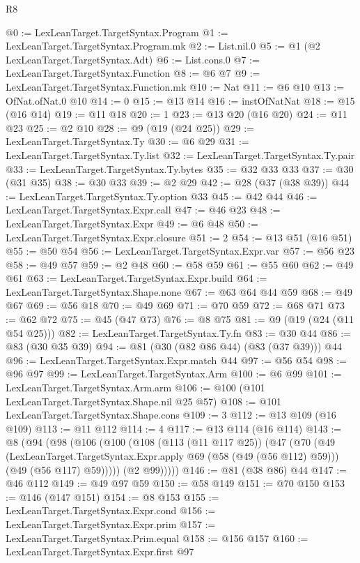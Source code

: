 \begin{lexlean}{R8}
\begin{coremodule}
@0 := LexLeanTarget.TargetSyntax.Program
@1 := LexLeanTarget.TargetSyntax.Program.mk
@2 := List.nil.{0}
@5 := @1 (@2 LexLeanTarget.TargetSyntax.Adt)
@6 := List.cons.{0}
@7 := LexLeanTarget.TargetSyntax.Function
@8 := @6 @7
@9 := LexLeanTarget.TargetSyntax.Function.mk
@10 := Nat
@11 := @6 @10
@13 := OfNat.ofNat.{0} @10
@14 := 0
@15 := @13 @14
@16 := instOfNatNat
@18 := @15 (@16 @14)
@19 := @11 @18
@20 := 1
@23 := @13 @20 (@16 @20)
@24 := @11 @23
@25 := @2 @10
@28 := @9 (@19 (@24 @25))
@29 := LexLeanTarget.TargetSyntax.Ty
@30 := @6 @29
@31 := LexLeanTarget.TargetSyntax.Ty.list
@32 := LexLeanTarget.TargetSyntax.Ty.pair
@33 := LexLeanTarget.TargetSyntax.Ty.bytes
@35 := @32 @33 @33
@37 := @30 (@31 @35)
@38 := @30 @33
@39 := @2 @29
@42 := @28 (@37 (@38 @39))
@44 := LexLeanTarget.TargetSyntax.Ty.option @33
@45 := @42 @44
@46 := LexLeanTarget.TargetSyntax.Expr.call
@47 := @46 @23
@48 := LexLeanTarget.TargetSyntax.Expr
@49 := @6 @48
@50 := LexLeanTarget.TargetSyntax.Expr.closure
@51 := 2
@54 := @13 @51 (@16 @51)
@55 := @50 @54
@56 := LexLeanTarget.TargetSyntax.Expr.var
@57 := @56 @23
@58 := @49 @57
@59 := @2 @48
@60 := @58 @59
@61 := @55 @60
@62 := @49 @61
@63 := LexLeanTarget.TargetSyntax.Expr.build
@64 := LexLeanTarget.TargetSyntax.Shape.none
@67 := @63 @64 @44 @59
@68 := @49 @67
@69 := @56 @18
@70 := @49 @69
@71 := @70 @59
@72 := @68 @71
@73 := @62 @72
@75 := @45 (@47 @73)
@76 := @8 @75
@81 := @9 (@19 (@24 (@11 @54 @25)))
@82 := LexLeanTarget.TargetSyntax.Ty.fn
@83 := @30 @44
@86 := @83 (@30 @35 @39)
@94 := @81 (@30 (@82 @86 @44) (@83 (@37 @39))) @44
@96 := LexLeanTarget.TargetSyntax.Expr.match @44
@97 := @56 @54
@98 := @96 @97
@99 := LexLeanTarget.TargetSyntax.Arm
@100 := @6 @99
@101 := LexLeanTarget.TargetSyntax.Arm.arm
@106 := @100 (@101 LexLeanTarget.TargetSyntax.Shape.nil @25 @57)
@108 := @101 LexLeanTarget.TargetSyntax.Shape.cons
@109 := 3
@112 := @13 @109 (@16 @109)
@113 := @11 @112
@114 := 4
@117 := @13 @114 (@16 @114)
@143 := @8
    (@94
      (@98
        (@106
          (@100
            (@108
              (@113 (@11 @117 @25))
              (@47
                (@70
                  (@49
                    (LexLeanTarget.TargetSyntax.Expr.apply @69 (@58 (@49 (@56 @112) @59)))
                    (@49 (@56 @117) @59)))))
            (@2 @99)))))
@146 := @81 (@38 @86) @44
@147 := @46 @112
@149 := @49 @97 @59
@150 := @58 @149
@151 := @70 @150
@153 := @146 (@147 @151)
@154 := @8 @153
@155 := LexLeanTarget.TargetSyntax.Expr.cond
@156 := LexLeanTarget.TargetSyntax.Expr.prim
@157 := LexLeanTarget.TargetSyntax.Prim.equal
@158 := @156 @157
@160 := LexLeanTarget.TargetSyntax.Expr.first @97

\end{coremodule}
\end{lexlean}

